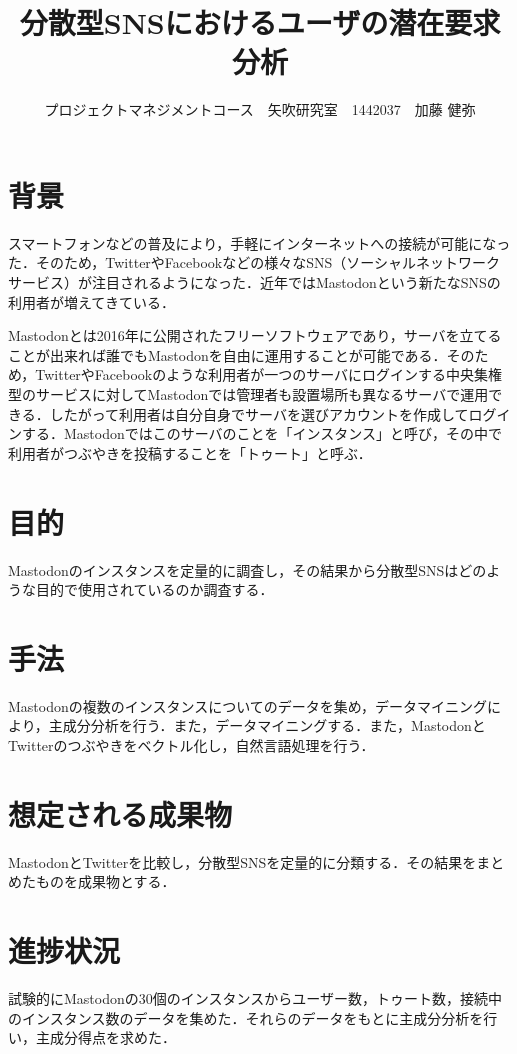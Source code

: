 \documentclass[uplatex,twocolumn,dvipdfmx]{jsarticle}
\title{\vspace{-5mm}\fontsize{14pt}{0pt}\selectfont 分散型SNSにおけるユーザの潜在要求分析}
\author{\normalsize プロジェクトマネジメントコース　矢吹研究室　1442037　加藤 健弥}
\date{}
\begin{document}
\fontsize{10.5pt}{\baselineskip}\selectfont
\maketitle





\section{背景}
スマートフォンなどの普及により，手軽にインターネットへの接続が可能になった．そのため，TwitterやFacebookなどの様々なSNS（ソーシャルネットワークサービス）が注目されるようになった．近年ではMastodonという新たなSNSの利用者が増えてきている．


Mastodonとは2016年に公開されたフリーソフトウェアであり，サーバを立てることが出来れば誰でもMastodonを自由に運用することが可能である．そのため，TwitterやFacebookのような利用者が一つのサーバにログインする中央集権型のサービスに対してMastodonでは管理者も設置場所も異なるサーバで運用できる．したがって利用者は自分自身でサーバを選びアカウントを作成してログインする．Mastodonではこのサーバのことを「インスタンス」と呼び，その中で利用者がつぶやきを投稿することを「トゥート」と呼ぶ\cite{wiki}．


\noindent


\section{目的}
Mastodonのインスタンスを定量的に調査し，その結果から分散型SNSはどのような目的で使用されているのか調査する．
\section{手法}
Mastodonの複数のインスタンスについてのデータを集め，データマイニングにより，主成分分析を行う．また，データマイニングする．また，MastodonとTwitterのつぶやきをベクトル化し，自然言語処理を行う．
\section{想定される成果物}
MastodonとTwitterを比較し，分散型SNSを定量的に分類する．その結果をまとめたものを成果物とする．
\section{進捗状況}
試験的にMastodonの30個のインスタンスからユーザー数，トゥート数，接続中のインスタンス数のデータを集めた．それらのデータをもとに主成分分析を行い，主成分得点を求めた．
\end{document}
